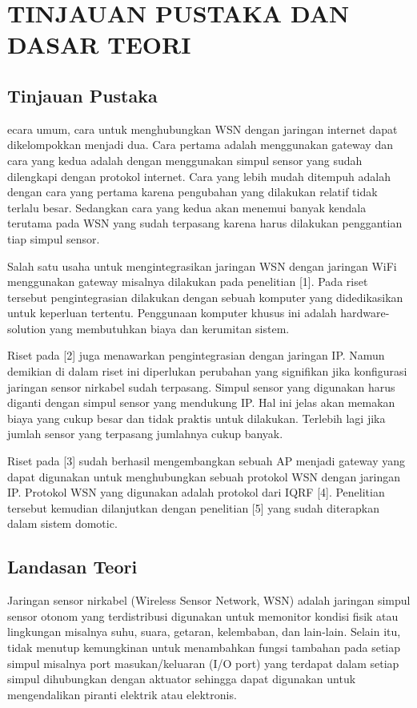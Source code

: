 \documentclass{jtetiproposalskripsi}
\begin{document}
\chapter{TINJAUAN PUSTAKA DAN DASAR TEORI}                

\section{Tinjauan Pustaka}
ecara umum, cara untuk menghubungkan WSN dengan jaringan internet dapat dikelompokkan menjadi dua. Cara pertama adalah menggunakan gateway dan cara yang kedua adalah dengan menggunakan simpul sensor yang sudah dilengkapi dengan protokol internet. Cara yang lebih mudah ditempuh adalah dengan cara yang pertama karena pengubahan yang dilakukan relatif tidak terlalu besar. Sedangkan cara yang kedua akan menemui banyak kendala terutama pada WSN yang sudah terpasang karena harus dilakukan penggantian tiap simpul sensor.

Salah satu usaha untuk mengintegrasikan jaringan WSN dengan jaringan WiFi menggunakan gateway misalnya dilakukan pada penelitian [1]. Pada riset tersebut pengintegrasian dilakukan dengan sebuah komputer yang didedikasikan untuk keperluan tertentu. Penggunaan komputer khusus ini adalah hardware-solution yang membutuhkan biaya dan kerumitan sistem.

Riset pada [2] juga menawarkan pengintegrasian dengan jaringan IP. Namun demikian di dalam riset ini diperlukan perubahan yang signifikan jika konfigurasi jaringan sensor nirkabel sudah terpasang. Simpul sensor yang digunakan harus diganti dengan simpul sensor yang mendukung IP. Hal ini jelas akan memakan biaya yang cukup besar dan tidak praktis untuk dilakukan. Terlebih lagi jika jumlah sensor yang terpasang jumlahnya cukup banyak.

Riset pada [3] sudah berhasil mengembangkan sebuah AP menjadi gateway yang dapat digunakan untuk menghubungkan sebuah protokol WSN dengan jaringan IP. Protokol WSN yang digunakan adalah protokol dari IQRF [4]. Penelitian tersebut kemudian dilanjutkan dengan penelitian [5] yang sudah diterapkan dalam sistem domotic.

\section{Landasan Teori}
Jaringan sensor nirkabel (Wireless Sensor Network, WSN) adalah jaringan simpul sensor otonom yang terdistribusi digunakan untuk memonitor kondisi fisik atau lingkungan misalnya suhu, suara, getaran, kelembaban, dan lain-lain. Selain itu, tidak menutup kemungkinan untuk menambahkan fungsi tambahan pada setiap simpul misalnya port masukan/keluaran (I/O port) yang terdapat dalam setiap simpul dihubungkan dengan aktuator sehingga dapat digunakan untuk mengendalikan piranti elektrik atau elektronis.
\end{document}
